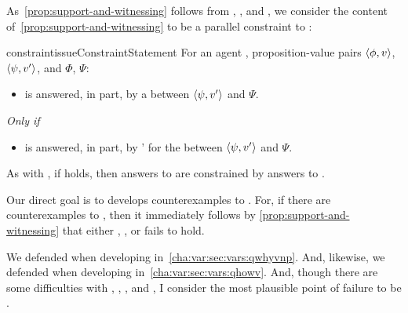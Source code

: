 \begin{note}
  As~\autoref{prop:support-and-witnessing} follows from \linkW{}, \linkH{}, and \issueInclusion{}, we consider the content of~\autoref{prop:support-and-witnessing} to be a parallel constraint to \issueInclusion{}:

  \begin{restatable}[\issueConstraint{}]{constraint}{issueConstraintStatement}
    \label{issue:has-witnessed}
    For an agent \vAgent{}, proposition-value pairs \(\langle \phi, v \rangle\), \(\langle \psi, v' \rangle\), and  \(\Phi\), \(\Psi\):

    \begin{itemize}
    \item
      \qWhyV{} is answered, in part, by a \ros{} between \(\langle \psi, v' \rangle\) and \(\Psi\).
    \end{itemize}

    \emph{Only if}

    \begin{itemize}
    \item
      \qHowV{} is answered, in part, by \vAgent{}'  for the \ros{} between \(\langle \psi, v' \rangle\) and \(\Psi\).
    \end{itemize}
    \vspace{-\baselineskip}
  \end{restatable}

  As with \issueInclusion{}, if \issueConstraint{} holds, then answers to \qWhyV{} are constrained by answers to \qHowV{}.

  Our direct goal is to develops counterexamples to \issueConstraint{}.
  For, if there are counterexamples to \issueConstraint{}, then it immediately follows by \autoref{prop:support-and-witnessing} that either \linkW{}, \linkH{}, or \issueInclusion{} fails to hold.

  We defended \linkW{} when developing \qWhyV{} in~\autoref{cha:var:sec:vars:qwhyvnp}.
  And, likewise, we defended \linkH{} when developing \qHowV{} in~\autoref{cha:var:sec:vars:qhowv}.
  And, though there are some difficulties with \qWhyV{}, \qHowV{}, \linkW{}, and \linkH{}, I consider the most plausible point of failure to be \issueInclusion{}.
\end{note}


